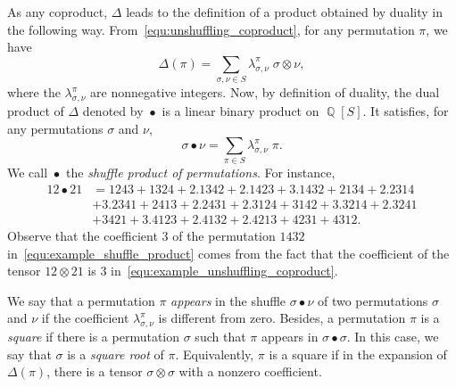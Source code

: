 \documentclass[a4paper,10pt]{llncs}
\DeclareMathOperator{\QQ}{\mathbb{Q}}
\DeclareMathOperator{\SHUFFLE}{\bullet}
\begin{document}
As any coproduct, $\Delta$ leads to the definition of a product obtained
by duality in the following way. From~\eqref{equ:unshuffling_coproduct},
for any permutation $\pi$, we have
\begin{equation}
    \Delta(\pi) =
    \sum_{\sigma, \nu \in S} \lambda_{\sigma, \nu}^\pi \;
    \sigma \otimes \nu,
\end{equation}
where the $\lambda_{\sigma, \nu}^\pi$ are nonnegative integers. Now,
by definition of duality, the dual product of $\Delta$ denoted by
$\SHUFFLE$ is a linear binary product on $\QQ[S]$. It satisfies, for any
permutations
$\sigma$ and $\nu$,
\begin{equation}
    \sigma \SHUFFLE \nu =
    \sum_{\pi \in S}
    \lambda_{\sigma, \nu}^\pi \; \pi.
\end{equation}
We call $\SHUFFLE$ the {\em shuffle product of permutations}. For
instance,
\begin{equation}\begin{split} \label{equ:example_shuffle_product}
    12 \SHUFFLE 21 & =
    1243 + 1324 + 2.1342 + 2.1423 + 3.1432 + 2134 + 2.2314 \\
    & + 3.2341 + 2413 + 2.2431 + 2.3124 + 3142 + 3.3214 + 2.3241 \\
    & + 3421 + 3.4123 + 2.4132 + 2.4213 + 4231 + 4312.
\end{split}\end{equation}
Observe that the coefficient $3$ of the permutation $1432$
in~\eqref{equ:example_shuffle_product} comes from the fact that the
coefficient of the tensor $12 \otimes 21$ is $3$
in~\eqref{equ:example_unshuffling_coproduct}.
\medskip

We say that a permutation $\pi$ {\em appears} in the shuffle
$\sigma \SHUFFLE \nu$ of two permutations $\sigma$ and $\nu$ if the
coefficient $\lambda_{\sigma, \nu}^\pi$ is different from zero.
Besides, a permutation $\pi$ is a {\em square} if there is a permutation
$\sigma$ such that $\pi$ appears in $\sigma \SHUFFLE \sigma$. In this
case, we say that $\sigma$ is a {\em square root} of $\pi$. Equivalently,
$\pi$ is a square if in the expansion of $\Delta(\pi)$, there is a
tensor $\sigma \otimes \sigma$ with a nonzero coefficient.
\medskip
\end{document}
